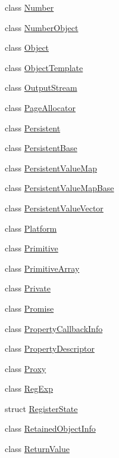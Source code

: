 \begin{DoxyCompactItemize}
\item 
class \mbox{\hyperlink{classv8_1_1Number}{Number}}
\item 
class \mbox{\hyperlink{classv8_1_1NumberObject}{Number\+Object}}
\item 
class \mbox{\hyperlink{classv8_1_1Object}{Object}}
\item 
class \mbox{\hyperlink{classv8_1_1ObjectTemplate}{Object\+Template}}
\item 
class \mbox{\hyperlink{classv8_1_1OutputStream}{Output\+Stream}}
\item 
class \mbox{\hyperlink{classv8_1_1PageAllocator}{Page\+Allocator}}
\item 
class \mbox{\hyperlink{classv8_1_1Persistent}{Persistent}}
\item 
class \mbox{\hyperlink{classv8_1_1PersistentBase}{Persistent\+Base}}
\item 
class \mbox{\hyperlink{classv8_1_1PersistentValueMap}{Persistent\+Value\+Map}}
\item 
class \mbox{\hyperlink{classv8_1_1PersistentValueMapBase}{Persistent\+Value\+Map\+Base}}
\item 
class \mbox{\hyperlink{classv8_1_1PersistentValueVector}{Persistent\+Value\+Vector}}
\item 
class \mbox{\hyperlink{classv8_1_1Platform}{Platform}}
\item 
class \mbox{\hyperlink{classv8_1_1Primitive}{Primitive}}
\item 
class \mbox{\hyperlink{classv8_1_1PrimitiveArray}{Primitive\+Array}}
\item 
class \mbox{\hyperlink{classv8_1_1Private}{Private}}
\item 
class \mbox{\hyperlink{classv8_1_1Promise}{Promise}}
\item 
class \mbox{\hyperlink{classv8_1_1PropertyCallbackInfo}{Property\+Callback\+Info}}
\item 
class \mbox{\hyperlink{classv8_1_1PropertyDescriptor}{Property\+Descriptor}}
\item 
class \mbox{\hyperlink{classv8_1_1Proxy}{Proxy}}
\item 
class \mbox{\hyperlink{classv8_1_1RegExp}{Reg\+Exp}}
\item 
struct \mbox{\hyperlink{structv8_1_1RegisterState}{Register\+State}}
\item 
class \mbox{\hyperlink{classv8_1_1RetainedObjectInfo}{Retained\+Object\+Info}}
\item 
class \mbox{\hyperlink{classv8_1_1ReturnValue}{Return\+Value}}
\item 

\end{DoxyCompactItemize}
